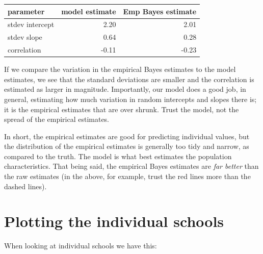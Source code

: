 \documentclass[
  letterpaper,
  DIV=11,
  numbers=noendperiod]{scrreprt}
\newenvironment{Shaded}{}{}
\newcommand{\AttributeTok}[1]{\textcolor[rgb]{0.49,0.56,0.16}{#1}}
\newcommand{\FloatTok}[1]{\textcolor[rgb]{0.25,0.63,0.44}{#1}}
\newcommand{\FunctionTok}[1]{\textcolor[rgb]{0.02,0.16,0.49}{#1}}
\newcommand{\NormalTok}[1]{#1}
\newcommand{\SpecialCharTok}[1]{\textcolor[rgb]{0.25,0.44,0.63}{#1}}
\newcommand{\StringTok}[1]{\textcolor[rgb]{0.25,0.44,0.63}{#1}}
\begin{document}
\begin{longtable}[]{@{}lrr@{}}
\toprule\noalign{}
parameter & model estimate & Emp Bayes estimate \\
\midrule\noalign{}
\endhead
\bottomrule\noalign{}
\endlastfoot
stdev intercept & 2.20 & 2.01 \\
stdev slope & 0.64 & 0.28 \\
correlation & -0.11 & -0.23 \\
\end{longtable}

If we compare the variation in the empirical Bayes estimates to the
model estimates, we see that the standard deviations are smaller and the
correlation is estimated as larger in magnitude. Importantly, our model
does a good job, in general, estimating how much variation in random
intercepts and slopes there is; it is the empirical estimates that are
over shrunk. Trust the model, not the spread of the empirical estimates.

In short, the empirical estimates are good for predicting individual
values, but the distribution of the empirical estimates is generally too
tidy and narrow, as compared to the truth. The model is what best
estimates the population characteristics. That being said, the empirical
Bayes estimates are \emph{far better} than the raw estimates (in the
above, for example, trust the red lines more than the dashed lines).

\section{Plotting the individual
schools}\label{plotting-the-individual-schools}

When looking at individual schools we have this:

\begin{Shaded}
\end{Shaded}
\end{document}
